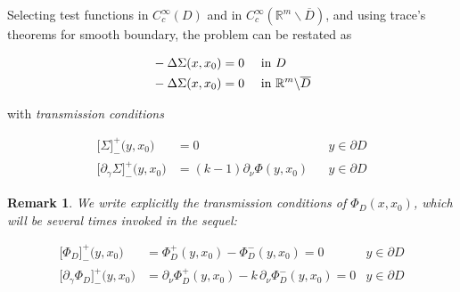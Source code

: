 \documentclass[10pt, a4paper, twoside, openright]{book}
\theoremstyle{definition}
\theoremstyle{plain}
\theoremstyle{plain}
\theoremstyle{plain}
\theoremstyle{plain}
\newtheorem{remark}[subsection]{Remark}
\theoremstyle{plain}
\theoremstyle{plain}
\theoremstyle{plain}
\theoremstyle{plain}
\begin{document}
Selecting test functions in $C^\infty_c(D)$ and in $C^\infty_c(\mathbb{R}^m\backslash \overline{D})$, and using trace's theorems for smooth boundary, the problem can be restated as
\begin{center}
\colorbox{light-gray}{\color{black}\parbox{\textwidth}{
\begin{align}
 &-\Delta \Sigma(x,x_0) = 0\quad\textup{ in }D \label{eq:laplacian-D}\\
 &-\Delta \Sigma(x,x_0) = 0\quad\textup{ in }\mathbb{R}^m\backslash\overline{D}\label{eq:laplacian-outside-D}
\end{align}
\begin{center}with \emph{transmission conditions}\end{center}
\begin{subequations}
\begin{align}
 \bigl[\Sigma\bigr]^+_-\bigl(y,x_0\bigr) &=0 && y \in\partial D \label{eq:transmissionF0}\\ 
 \bigl[\partial_\gamma \Sigma\bigr]^+_-\bigl(y,x_0\bigr) &= (k - 1)\partial_\nu \Phi(y,x_0) && y \in\partial D \label{eq:transmissionF1}
\end{align}
\end{subequations}
}}
\end{center}
\begin{remark}
 We write explicitly the transmission conditions of $\Phi_D(x,x_0)$, which will be several times invoked in the sequel:
\begin{center}
\colorbox{light-gray}{\color{black}\parbox{\textwidth}{
\begin{subequations}
\begin{align}
 \bigl[\Phi_D\bigr]^+_-\bigl(y,x_0\bigr)&=\Phi_D^+(y,x_0) - \Phi_D^-(y,x_0) =0 & y \in\partial D \label{eq:transmissionPhiD0}\\ 
 \bigl[\partial_\gamma \Phi_D\bigr]^+_-\bigl(y,x_0\bigr) &= \partial_\nu \Phi_D^+(y,x_0) - k\,\partial_\nu \Phi_D^-(y,x_0) =0 & y \in\partial D \label{eq:transmissionPhiD1}
\end{align}
\end{subequations}
}}
\end{center}
\end{remark}
\end{document}

